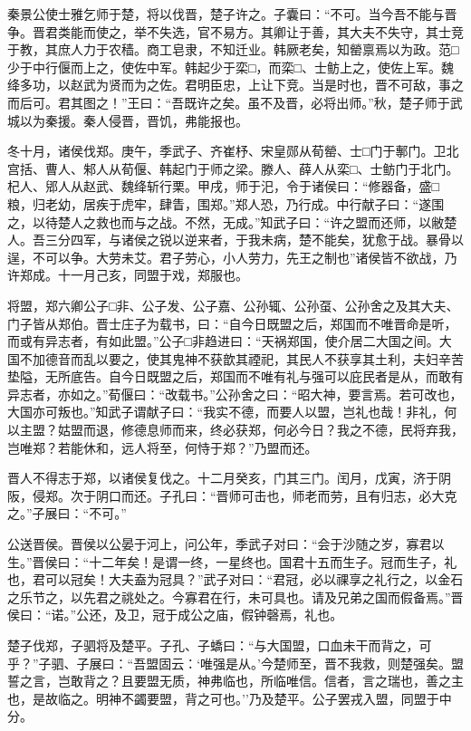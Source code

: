 \documentclass[]{article}
\begin{document}
秦景公使士雅乞师于楚，将以伐晋，楚子许之。子囊曰：``不可。当今吾不能与晋争。晋君类能而使之，举不失选，官不易方。其卿让于善，其大夫不失守，其士竞于教，其庶人力于农穑。商工皂隶，不知迁业。韩厥老矣，知罃禀焉以为政。范□少于中行偃而上之，使佐中军。韩起少于栾□，而栾□、士鲂上之，使佐上军。魏绛多功，以赵武为贤而为之佐。君明臣忠，上让下竞。当是时也，晋不可敌，事之而后可。君其图之！''王曰：``吾既许之矣。虽不及晋，必将出师。''秋，楚子师于武城以为秦援。秦人侵晋，晋饥，弗能报也。

冬十月，诸侯伐郑。庚午，季武子、齐崔杼、宋皇郧从荀罃、士□门于鄟门。卫北宫括、曹人、邾人从荀偃、韩起门于师之梁。滕人、薛人从栾□、士鲂门于北门。杞人、郳人从赵武、魏绛斩行栗。甲戌，师于汜，令于诸侯曰：``修器备，盛□粮，归老幼，居疾于虎牢，肆眚，围郑。''郑人恐，乃行成。中行献子曰：``遂围之，以待楚人之救也而与之战。不然，无成。''知武子曰：``许之盟而还师，以敝楚人。吾三分四军，与诸侯之锐以逆来者，于我未病，楚不能矣，犹愈于战。暴骨以逞，不可以争。大劳未艾。君子劳心，小人劳力，先王之制也''诸侯皆不欲战，乃许郑成。十一月己亥，同盟于戏，郑服也。

将盟，郑六卿公子□非、公子发、公子嘉、公孙辄、公孙虿、公孙舍之及其大夫、门子皆从郑伯。晋士庄子为载书，曰：``自今日既盟之后，郑国而不唯晋命是听，而或有异志者，有如此盟。''公子□非趋进曰：``天祸郑国，使介居二大国之间。大国不加德音而乱以要之，使其鬼神不获歆其禋祀，其民人不获享其土利，夫妇辛苦垫隘，无所底告。自今日既盟之后，郑国而不唯有礼与强可以庇民者是从，而敢有异志者，亦如之。''荀偃曰：``改载书。''公孙舍之曰：``昭大神，要言焉。若可改也，大国亦可叛也。''知武子谓献子曰：``我实不德，而要人以盟，岂礼也哉！非礼，何以主盟？姑盟而退，修德息师而来，终必获郑，何必今日？我之不德，民将弃我，岂唯郑？若能休和，远人将至，何恃于郑？''乃盟而还。

晋人不得志于郑，以诸侯复伐之。十二月癸亥，门其三门。闰月，戊寅，济于阴阪，侵郑。次于阴口而还。子孔曰：``晋师可击也，师老而劳，且有归志，必大克之。''子展曰：``不可。''

公送晋侯。晋侯以公晏于河上，问公年，季武子对曰：``会于沙随之岁，寡君以生。''晋侯曰：``十二年矣！是谓一终，一星终也。国君十五而生子。冠而生子，礼也，君可以冠矣！大夫盍为冠具？''武子对曰：``君冠，必以祼享之礼行之，以金石之乐节之，以先君之祧处之。今寡君在行，未可具也。请及兄弟之国而假备焉。''晋侯曰：``诺。''公还，及卫，冠于成公之庙，假钟磬焉，礼也。

楚子伐郑，子驷将及楚平。子孔、子蟜曰：``与大国盟，口血未干而背之，可乎？''子驷、子展曰：``吾盟固云：`唯强是从。'今楚师至，晋不我救，则楚强矣。盟誓之言，岂敢背之？且要盟无质，神弗临也，所临唯信。信者，言之瑞也，善之主也，是故临之。明神不蠲要盟，背之可也。''乃及楚平。公子罢戎入盟，同盟于中分。
\end{document}
